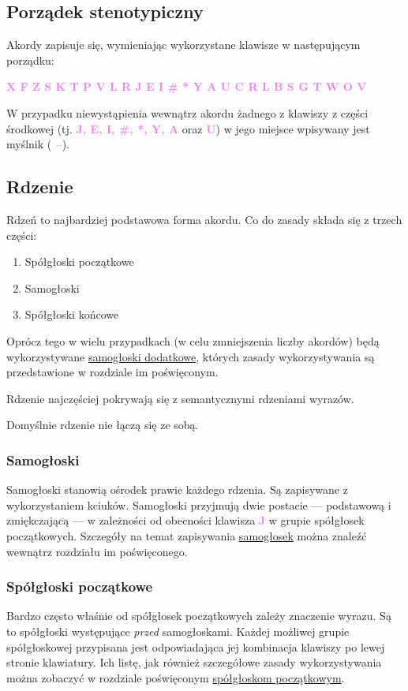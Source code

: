 \documentclass[12p, oneside]{book}
\newcommand{\steno}[1]{\textbf{\textsf{\textcolor{violet}{ #1}}}}
\begin{document}
\subsection{Porządek stenotypiczny}
Akordy zapisuje się, wymieniając wykorzystane klawisze w następującym porządku:

\steno{X F Z S K T P V L R J E I \# * Y A U C R L B S G T W O V}

W przypadku niewystąpienia wewnątrz akordu żadnego z klawiszy z części środkowej (tj. \steno{J, E, I, \#, *, Y, A} oraz \steno{U}) w jego miejsce wpisywany jest myślnik (\steno{--}).
\subsection{Rdzenie}
Rdzeń to najbardziej podstawowa forma akordu. Co do zasady składa się z trzech części:
\begin{enumerate}
	\item Spółgłoski początkowe
	\item Samogłoski
	\item Spółgłoski końcowe
\end{enumerate}
Oprócz tego w wielu przypadkach (w celu zmniejszenia liczby akordów) będą wykorzystywane \hyperref[sec:dodatkowe]{samogłoski dodatkowe}, których zasady wykorzystywania są przedstawione w rozdziale im poświęconym.

Rdzenie najczęściej pokrywają się z semantycznymi rdzeniami wyrazów. 

Domyślnie rdzenie nie łączą się ze sobą.

\subsubsection{Samogłoski}
Samogłoski stanowią ośrodek prawie każdego rdzenia. Są zapisywane z wykorzystaniem kciuków. Samogłoski przyjmują dwie postacie --- podstawową i zmiękczającą --- w zależności od obecności klawisza \steno{J} w grupie spółgłosek początkowych. Szczegóły na temat zapisywania \hyperref[sec:samogloski]{samogłosek} można znaleźć wewnątrz rozdziału im poświęconego.

\subsubsection{Spółgłoski początkowe}
Bardzo często właśnie od spółgłosek początkowych zależy znaczenie wyrazu. Są to spółgłoski występujące \emph{przed} samogłoskami. Każdej możliwej grupie spółgłoskowej przypisana jest odpowiadająca jej kombinacja klawiszy po lewej stronie klawiatury. Ich listę, jak również szczegółowe zasady wykorzystywania można zobaczyć w rozdziale poświęconym \hyperref[sec:poczatkowe]{spółgłoskom początkowym}.
\end{document}
